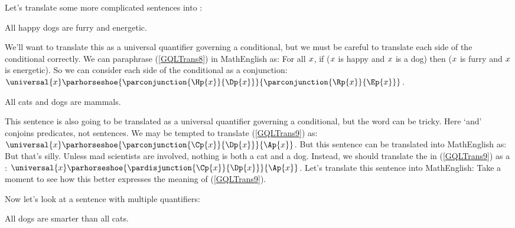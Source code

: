 Let's translate some more complicated sentences into \GQL{}:

\begin{menumerate}
	\item\label{GQLTrans8} All happy dogs are furry and energetic.
\end{menumerate}

\noindent{}We'll want to translate this as a universal quantifier governing a conditional, but we must be careful to translate each side of the conditional correctly.  We can paraphrase (\ref{GQLTrans8}) in MathEnglish as: For all $x$, if ($x$ is happy and $x$ is a dog) then ($x$ is furry and $x$ is energetic).  So we can consider each side of the conditional as a conjunction: $\universal{\variable{x}}\parhorseshoe{\parconjunction{\Hp{\variable{x}}}{\Dp{\variable{x}}}}{\parconjunction{\Rp{\variable{x}}}{\Ep{\variable{x}}}}$.

\begin{menumerate}
	\item\label{GQLTrans9} All cats and dogs are mammals.
\end{menumerate}

\noindent{}This sentence is also going to be translated as a universal quantifier governing a conditional, but the word  can be tricky.  Here `and' conjoins predicates, not sentences.  We may be tempted to translate (\ref{GQLTrans9}) as: $\universal{\variable{x}}\parhorseshoe{\parconjunction{\Cp{\variable{x}}}{\Dp{\variable{x}}}}{\Ap{\variable{x}}}$.  But this \GQL{} sentence can be translated into MathEnglish as:   But that's silly.  Unless mad scientists are involved, nothing is both a cat and a dog.  Instead, we should translate the  in (\ref{GQLTrans9}) as a \mention{$\VEE$}:  $\universal{\variable{x}}\parhorseshoe{\pardisjunction{\Cp{\variable{x}}}{\Dp{\variable{x}}}}{\Ap{\variable{x}}}$.  Let's translate this \GQL{} sentence into MathEnglish:   Take a moment to see how this better expresses the meaning of (\ref{GQLTrans9}).

Now let's look at a sentence with multiple quantifiers:

\begin{menumerate}
	\item\label{GQLTrans10} All dogs are smarter than all cats.
\end{menumerate}

